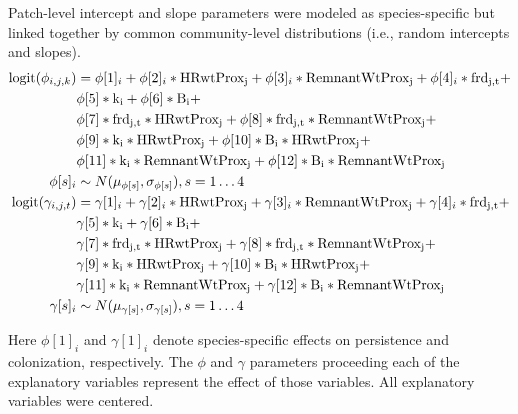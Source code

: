 \documentclass{article}\usepackage[]{graphicx}\usepackage[]{color}
\begin{document}
Patch-level intercept and slope parameters were modeled as species-specific but
linked together by common community-level distributions (i.e., random intercepts and slopes). 
%
\begin{equation}
\begin{split}
\label{eq:phi_gam}
\mathrm{logit}(\phi_{i,j,k}) &=
\phi[1]_i +
\phi[2]_i* \mathrm{HRwtProx_j} +
\phi[3]_i* \mathrm{RemnantWtProx_j} + 
\phi[4]_i* \mathrm{frd_{j,t}} + \\
& \phi[5]* \mathrm{k_i} + 
\phi[6]* \mathrm{B_i} +  \\
& \phi[7]* \mathrm{frd_{j,t}}*\mathrm{HRwtProx_j}  +
\phi[8]* \mathrm{frd_{j,t}}*\mathrm{RemnantWtProx_j}  + \\
& \phi[9]* \mathrm{k_i}*\mathrm{HRwtProx_j}  + 
\phi[10]* \mathrm{B_i}*\mathrm{HRwtProx_j}  +  \\
& \phi[11]* \mathrm{k_i}*\mathrm{RemnantWtProx_j}  +  \phi[12]* \mathrm{B_i}*\mathrm{RemnantWtProx_j} \\
\phi[s]_i &\sim N(\mu_{\phi[s]}, \sigma_{\phi[s]}), s = 1 \ldots 4
\hspace{0.2em}\\
\mathrm{logit}(\gamma_{i,j,t}) &=
\gamma[1]_i +
\gamma[2]_i* \mathrm{HRwtProx_j} +
\gamma[3]_i* \mathrm{RemnantWtProx_j} + 
\gamma[4]_i* \mathrm{frd_{j,t}} + \\
& \gamma[5]* \mathrm{k_i} +
\gamma[6]* \mathrm{B_i} + \\
& \gamma[7]* \mathrm{frd_{j,t}}*\mathrm{HRwtProx_j}  +
\gamma[8]* \mathrm{frd_{j,t}}*\mathrm{RemnantWtProx_j}  + \\
& \gamma[9]* \mathrm{k_i}*\mathrm{HRwtProx_j}  + 
\gamma[10]* \mathrm{B_i}*\mathrm{HRwtProx_j}  + \\
& \gamma[11]* \mathrm{k_i}*\mathrm{RemnantWtProx_j} + 
\gamma[12]* \mathrm{B_i}*\mathrm{RemnantWtProx_j} \\
\gamma[s]_i &\sim N(\mu_{\gamma[s]}, \sigma_{\gamma[s]}), s = 1 \ldots 4 \hspace{0.2em}\\
\end{split}
\end{equation}
%

Here $\phi[1]_i$ and $\gamma[1]_i$ denote species-specific effects on
persistence and colonization, respectively. The $\phi$ and $\gamma$
parameters proceeding each of the explanatory variables represent the
effect of those variables. All explanatory variables were centered. 
\end{document}
